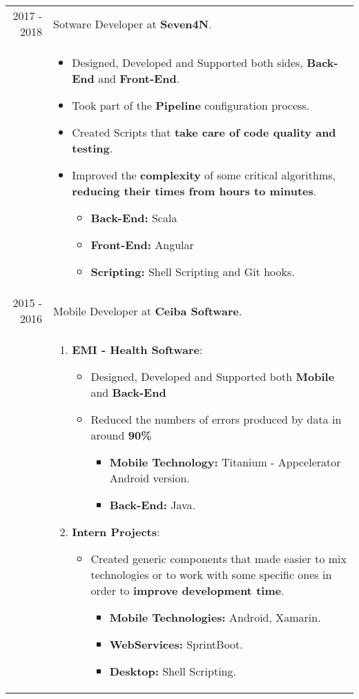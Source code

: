 \documentclass[a4paper,11pt]{article} %
\begin{document}
\begin{tabular}{r|p{12cm}}
\textsc{2017 - 2018} & Sotware Developer at \textbf{Seven4N}.\\
& \footnotesize{
\begin{itemize}
\item Designed, Developed and Supported both sides, \textbf{Back-End} and \textbf{Front-End}.
\item Took part of the \textbf{Pipeline} configuration process.
\item Created Scripts that \textbf{take care of code quality and testing}.
\item Improved the \textbf{complexity} of some critical algorithms, \textbf{reducing their times from hours to minutes}.
\begin{itemize}
\item \textbf{Back-End:} Scala
\item \textbf{Front-End:} Angular
\item \textbf{Scripting:} Shell Scripting and Git hooks.
\end{itemize}
\end{itemize}}\\
\textsc{2015 - 2016} & Mobile Developer at \textbf{Ceiba Software}.\\
& \footnotesize{
\begin{enumerate}
\item \textbf{EMI - Health Software}:
\begin{itemize}
\item Designed, Developed and Supported both \textbf{Mobile} and \textbf{Back-End}
\item Reduced the numbers of errors produced by data in around \textbf{90\%}
\begin{itemize}
\item \textbf{Mobile Technology:} Titanium - Appcelerator Android version.
\item \textbf{Back-End:} Java.
\end{itemize}
\end{itemize}
\item \textbf{Intern Projects}:
\begin{itemize}
\item Created generic components that made easier to mix technologies or to work with some specific ones in order to \textbf{improve development time}.
\begin{itemize}
\item \textbf{Mobile Technologies:} Android, Xamarin.
\item \textbf{WebServices:} SprintBoot.
\item \textbf{Desktop:} Shell Scripting.

\end{itemize}
\end{itemize}
\end{enumerate}}
\end{tabular}
\end{document}
